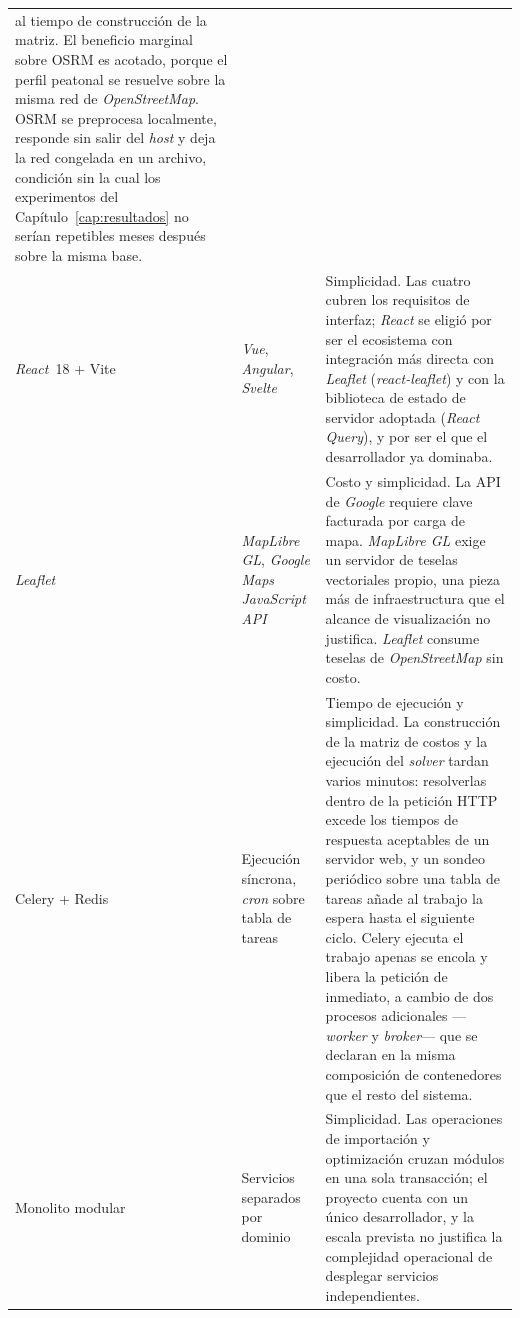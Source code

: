 \begin{xltabular}{\textwidth}{@{}>{\raggedright\arraybackslash}p{2.0cm} >{\raggedright\arraybackslash}p{2.1cm} X@{}}
      al tiempo de construcción de la matriz. El beneficio marginal sobre OSRM es acotado, porque el
      perfil peatonal se resuelve sobre la misma red de \textit{OpenStreetMap}. OSRM se preprocesa
      localmente, responde sin salir del \textit{host} y deja la red congelada en un archivo,
      condición sin la cual los experimentos del Capítulo~\ref{cap:resultados} no serían repetibles
      meses después sobre la misma base. \\
      \addlinespace
    \textit{React}~18 + Vite &
      \textit{Vue}, \textit{Angular}, \textit{Svelte} &
      Simplicidad. Las cuatro cubren los requisitos de interfaz; \textit{React} se eligió por ser el
      ecosistema con integración más directa con \textit{Leaflet}
      (\textit{react-leaflet}) y con la biblioteca de estado de servidor adoptada
      (\textit{React Query}), y por ser el que el desarrollador ya dominaba. \\
      \addlinespace
    \textit{Leaflet} &
      \textit{MapLibre GL}, \textit{Google Maps JavaScript API} &
      Costo y simplicidad. La API de \textit{Google} requiere clave facturada por carga de mapa.
      \textit{MapLibre GL} exige un servidor de teselas vectoriales propio, una pieza más de
      infraestructura que el alcance de visualización no justifica. \textit{Leaflet} consume teselas
      de \textit{OpenStreetMap} sin costo. \\
      \addlinespace
    Celery + Redis &
      Ejecución síncrona, \textit{cron} sobre tabla de tareas &
      Tiempo de ejecución y simplicidad. La construcción de la matriz de costos y la ejecución del
      \textit{solver} tardan varios minutos: resolverlas dentro de la petición HTTP excede los
      tiempos de respuesta aceptables de un servidor web, y un sondeo periódico sobre una tabla de
      tareas añade al trabajo la espera hasta el siguiente ciclo. Celery ejecuta el trabajo apenas
      se encola y libera la petición de inmediato, a cambio de dos procesos adicionales
      ---\textit{worker} y \textit{broker}--- que se declaran en la misma composición de
      contenedores que el resto del sistema. \\
      \addlinespace
    Monolito modular &
      Servicios separados por dominio &
      Simplicidad. Las operaciones de importación y optimización cruzan módulos en una sola
      transacción; el proyecto cuenta con un único desarrollador, y la escala prevista no justifica
      la complejidad operacional de desplegar servicios independientes. \\
\end{xltabular}
\normalsize

